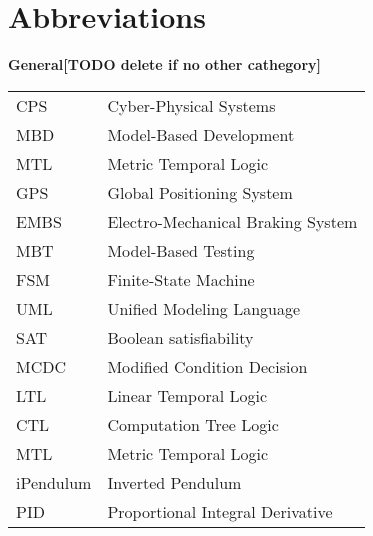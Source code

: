 \chapter*{Abbreviations}

{\bf General[TODO delete if no other cathegory]}\\

\begin{tabular}{ll}
CPS & Cyber-Physical Systems\\
MBD & Model-Based Development\\
MTL & Metric Temporal Logic\\
GPS & Global Positioning System\\
EMBS & Electro-Mechanical Braking System\\
MBT & Model-Based Testing\\
FSM & Finite-State Machine\\
UML & Unified Modeling Language\\
SAT & Boolean satisfiability\\
MCDC & Modified Condition Decision\\
LTL &  Linear Temporal Logic\\
CTL & Computation Tree Logic\\
MTL & Metric Temporal Logic\\
iPendulum & Inverted Pendulum\\
PID & Proportional Integral Derivative
\end{tabular}
\vskip 1cm

\\

